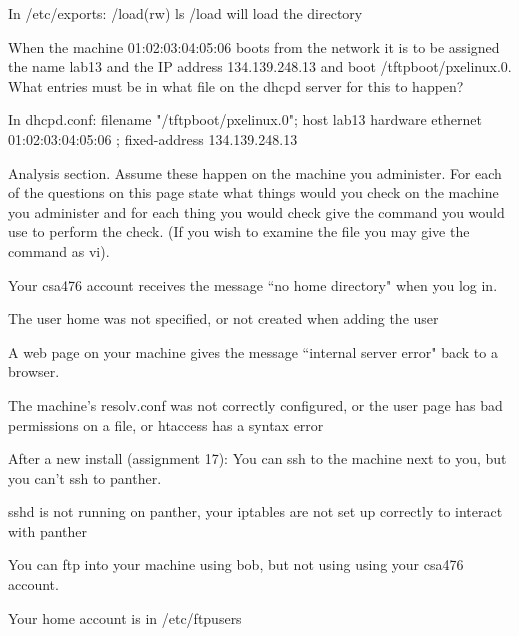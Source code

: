 In /etc/exports:
/load(rw)
ls /load will load the directory

When the machine {\ltt{}01:02:03:04:05:06} boots from the network
it is to be assigned the name {\ltt{}lab13} and the IP address
{\ltt{}134.139.248.13} and boot {\ltt{}/tftpboot/pxelinux.0}.
What entries must be in what file on the dhcpd server
for this to happen?
\vskip 2.0in
\vfill\eject

In dhcpd.conf:
filename "/tftpboot/pxelinux.0";
host lab13 {
  hardware ethernet 01:02:03:04:05:06 ;
  fixed-address 134.139.248.13
}

Analysis section. Assume these happen on the machine you administer.
For each of the questions on this page
state what things would you check on the machine you administer
and for each thing you would check give the command you would use to
perform the check. (If you wish to examine the file you may give the
command as {\ltt{}vi}).

\ques
Your {\ltt{}csa476} account receives the message ``no home directory"
when you log in.
\vfill
\ques

The user home was not specified, or not created when adding the user

A web page on your machine gives the message ``internal server
error" back to a browser.
\vfill
\ques

The machine's resolv.conf was not correctly configured,
or the user page has bad permissions on a file,
or htaccess has a syntax error

After a new install (assignment 17):
You can ssh to the machine next to you, but you can't
ssh to panther.
\vfill
\ques

sshd is not running on panther,
your iptables are not set up correctly to interact with panther

You can ftp into your machine using {\ltt{}bob}, but not
using using your {\ltt{}csa476} account.
\bye

Your home account is in /etc/ftpusers

